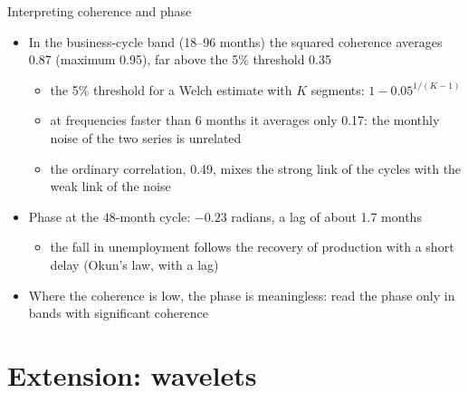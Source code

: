 \begin{frame}{Interpreting coherence and phase}
\itemsize{\small}
\begin{itemize}
    \item In the business-cycle band (18--96 months) the squared coherence averages 0.87 (maximum 0.95), far above the 5\% threshold 0.35
    \begin{itemize}
        \item the 5\% threshold for a Welch estimate with $K$ segments: $1 - 0.05^{1/(K-1)}$
        \item at frequencies faster than 6 months it averages only 0.17: the monthly noise of the two series is unrelated
        \item the ordinary correlation, 0.49, mixes the strong link of the cycles with the weak link of the noise
    \end{itemize}
    \item Phase at the 48-month cycle: $-0.23$ radians, a lag of about 1.7 months
    \begin{itemize}
        \item the fall in unemployment follows the recovery of production with a short delay (Okun's law, with a lag)
    \end{itemize}
    \item Where the coherence is low, the phase is meaningless: read the phase only in bands with significant coherence
\end{itemize}
\end{frame}


\section{Extension: wavelets}

